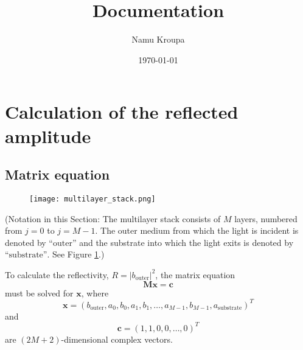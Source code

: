 \documentclass[]{article}
\title{Documentation}
\author{Namu Kroupa}
\date{\today}
\begin{document}
	\maketitle
	
	\section{Calculation of the reflected amplitude}
	\subsection{Matrix equation}
	\begin{figure}[H]
		\centering
		\texttt{[image: multilayer\_stack.png]}
		\caption{}
		\label{fig:multilayer-stack}
	\end{figure}
	
	{\small
	(Notation in this Section: The multilayer stack consists of $M$ layers, numbered from $j=0$ to $j=M-1$. The outer medium from which the light is incident is denoted by $\text{``outer''}$ and the substrate into which the light exits is denoted by $\text{``substrate''}$. See Figure \ref{fig:multilayer-stack}.)}
	
	To calculate the reflectivity, $R=|b_\text{outer}|^2$, the matrix equation 
	\begin{equation}\label{eqn:matrix-equation}
		\mathbf{M}\mathbf{x}=\mathbf{c}
	\end{equation}
	must be solved for $\mathbf{x}$, where
	\begin{equation}
		\mathbf{x}=(b_\text{outer},a_0,b_0,a_1,b_1,\dots,a_{M-1},b_{M-1},a_\text{substrate})^T
	\end{equation}
	and
	\begin{equation}
		\mathbf{c}=(1,1,0,0,\dots,0)^T
	\end{equation}
	are $(2M+2)$-dimensional complex vectors.
	
\end{document}

